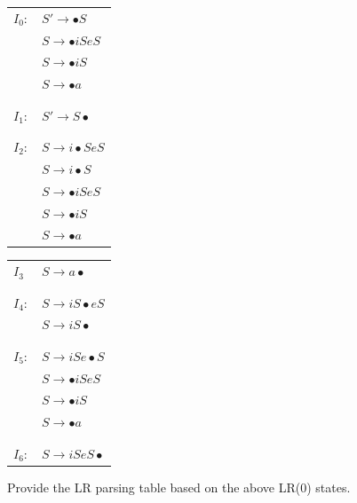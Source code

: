 \documentclass[12pt]{article}
\begin{document}
\begin{exe}
\begin{xlist}
{\begin{soln}
\begin{minipage}[t]{3in}
\begin{tabular}{ll}
$I_0:$ & $S' \rightarrow \bullet S$ \\
& $S \rightarrow \bullet iSeS$ \\
& $S \rightarrow \bullet iS$ \\
& $S \rightarrow \bullet a$ \\
& \\
& \\
$I_1:$ & $S' \rightarrow S \bullet$ \\
& \\
& \\
$I_2:$ & $S \rightarrow i \bullet SeS$ \\
& $S \rightarrow i \bullet S$ \\
& $S \rightarrow \bullet iSeS$ \\
& $S \rightarrow \bullet iS$ \\
& $S \rightarrow \bullet a$ \\
\end{tabular}
\end{minipage}
\begin{minipage}[t]{3in}
\begin{tabular}{ll}
$I_3$ & $S \rightarrow a \bullet$ \\
& \\
& \\
$I_4:$ & $S \rightarrow iS \bullet eS$ \\
& $S \rightarrow iS \bullet $ \\
& \\
& \\
$I_5:$ & $S \rightarrow iSe \bullet S$ \\
& $S \rightarrow \bullet iSeS$ \\
& $S \rightarrow \bullet iS$ \\
& $S \rightarrow \bullet a$ \\
& \\
& \\
$I_6:$ & $S \rightarrow iSeS  \bullet $ \\
\end{tabular}
\end{minipage}

\bigskip

\end{soln}
}

{\ex Provide the LR parsing table based on the above LR(0) states.

}
\end{xlist}
\end{exe}
\end{document}
